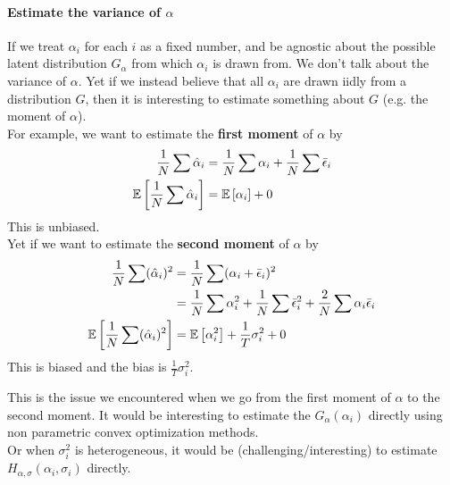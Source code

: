 \paragraph{Estimate the variance of $\alpha$} If we treat $\alpha_i$ for each $i$
as a fixed number, and be agnostic about the possible latent distribution
$G_{\alpha}$ from which $\alpha_i$ is drawn from. We don't talk about the
variance of $\alpha$. Yet if we instead believe that all $\alpha_i$ are drawn
iidly from a distribution $G$, then it is interesting to estimate something
about $G$ (e.g. the moment of $\alpha$). \\ For example, we want to estimate
the \textbf{first moment} of $\alpha$ by \begin{equation*}
    \begin{split}
        \frac{1}{N}\sum \hat{\alpha}_i &= \frac{1}{N}\sum \alpha_i + \frac{1}{N}\sum \bar{\epsilon}_i\\
        \mathbb{E}\left[\frac{1}{N}\sum \hat{\alpha}_i\right] &= \mathbb{E}\left[\alpha_i\right] + 0
    \end{split}
\end{equation*}
This is unbiased.\\
Yet if we want to estimate the \textbf{second moment} of $\alpha$ by \begin{equation*}
    \begin{split}
        \frac{1}{N}\sum (\hat{\alpha}_i)^2 &= \frac{1}{N}\sum (\alpha_i+\bar{\epsilon}_i)^2\\
        &= \frac{1}{N}\sum \alpha_i^2 + \frac{1}{N}\sum \bar{\epsilon}_i^2 + \frac{2}{N}\sum \alpha_i\bar{\epsilon}_i\\
        \mathbb{E}\left[\frac{1}{N}\sum (\hat{\alpha}_i)^2\right] &= \mathbb{E}\left[\alpha_i^2\right] + \frac{1}{T}\sigma_i^2+0\\
    \end{split}
\end{equation*}
This is biased and the bias is $\frac{1}{T}\sigma_i^2$.

This is the issue we encountered when we go from the first moment of $\alpha$
to the second moment. It would be interesting to estimate the
$G_{\alpha}(\alpha_i)$ directly using non parametric convex optimization
methods.\\ Or when $\sigma_i^2$ is heterogeneous, it would be
(challenging/interesting) to estimate $H_{\alpha,\sigma}(\alpha_i,\sigma_i)$
directly.

